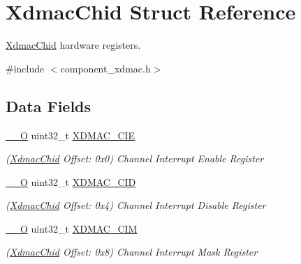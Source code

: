 \hypertarget{structXdmacChid}{}\section{Xdmac\+Chid Struct Reference}
\label{structXdmacChid}


\mbox{\hyperlink{structXdmacChid}{Xdmac\+Chid}} hardware registers.  




{\ttfamily \#include $<$component\+\_\+xdmac.\+h$>$}

\subsection*{Data Fields}
\begin{DoxyCompactItemize}
\item 
\mbox{\label{structXdmacChid_a48370215d81bb27c628d2e6bb980d979}} 
\mbox{\hyperlink{core__cm7_8h_a7e25d9380f9ef903923964322e71f2f6}{\+\_\+\+\_\+O}} uint32\+\_\+t \mbox{\hyperlink{structXdmacChid_a48370215d81bb27c628d2e6bb980d979}{X\+D\+M\+A\+C\+\_\+\+C\+IE}}
\begin{DoxyCompactList}\small\item\em (\mbox{\hyperlink{structXdmacChid}{Xdmac\+Chid}} Offset\+: 0x0) Channel Interrupt Enable Register \end{DoxyCompactList}\item 
\mbox{\label{structXdmacChid_a2a3b070b9623b9b21460f4daf2de232a}} 
\mbox{\hyperlink{core__cm7_8h_a7e25d9380f9ef903923964322e71f2f6}{\+\_\+\+\_\+O}} uint32\+\_\+t \mbox{\hyperlink{structXdmacChid_a2a3b070b9623b9b21460f4daf2de232a}{X\+D\+M\+A\+C\+\_\+\+C\+ID}}
\begin{DoxyCompactList}\small\item\em (\mbox{\hyperlink{structXdmacChid}{Xdmac\+Chid}} Offset\+: 0x4) Channel Interrupt Disable Register \end{DoxyCompactList}\item 
\mbox{\label{structXdmacChid_a5a8ac8e72fa0ea26b697c70ff4338c22}} 
\mbox{\hyperlink{core__cm7_8h_a7e25d9380f9ef903923964322e71f2f6}{\+\_\+\+\_\+O}} uint32\+\_\+t \mbox{\hyperlink{structXdmacChid_a5a8ac8e72fa0ea26b697c70ff4338c22}{X\+D\+M\+A\+C\+\_\+\+C\+IM}}
\begin{DoxyCompactList}\small\item\em (\mbox{\hyperlink{structXdmacChid}{Xdmac\+Chid}} Offset\+: 0x8) Channel Interrupt Mask Register \end{DoxyCompactList}\item 

\end{DoxyCompactItemize}
